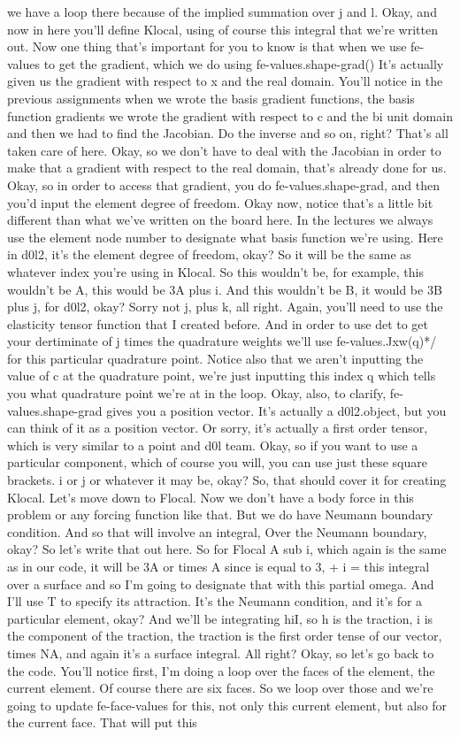 \documentclass[10pt]{article}
\begin{document}
we have a loop there because of the implied summation over j and l. Okay, and now in here you'll define Klocal, using of course this integral that we're written out. Now one thing that's important for you to know is that when we use fe-values to get the gradient, which we do using fe-values.shape-grad() It's actually given us the gradient with respect to x and the real domain. You'll notice in the previous assignments when we wrote the basis gradient functions, the basis function gradients we wrote the gradient with respect to c and the bi unit domain and then we had to find the Jacobian. Do the inverse and so on, right? That's all taken care of here. Okay, so we don't have to deal with the Jacobian in order to make that a gradient with respect to the real domain, that's already done for us. Okay, so in order to access that gradient, you do fe-values.shape-grad, and then you'd input the element degree of freedom. Okay now, notice that's a little bit different than what we've written on the board here. In the lectures we always use the element node number to designate what basis function we're using. Here in d0l2, it's the element degree of freedom, okay? So it will be the same as whatever index you're using in Klocal. So this wouldn't be, for example, this wouldn't be A, this would be 3A plus i. And this wouldn't be B, it would be 3B plus j, for d0l2, okay? Sorry not j, plus k, all right. Again, you'll need to use the elasticity tensor function that I created before. And in order to use det to get your dertiminate of j times the quadrature weights we'll use fe-values.Jxw(q)*/ for this particular quadrature point. Notice also that we aren't inputting the value of c at the quadrature point, we're just inputting this index q which tells you what quadrature point we're at in the loop. Okay, also, to clarify, fe-values.shape-grad gives you a position vector. It's actually a d0l2.object, but you can think of it as a position vector. Or sorry, it's actually a first order tensor, which is very similar to a point and d0l team. Okay, so if you want to use a particular component, which of course you will, you can use just these square brackets. i or j or whatever it may be, okay? So, that should cover it for creating Klocal. Let's move down to Flocal. Now we don't have a body force in this problem or any forcing function like that. But we do have Neumann boundary condition. And so that will involve an integral, Over the Neumann boundary, okay? So let's write that out here. So for Flocal A sub i, which again is the same as in our code, it will be 3A or times A since is equal to 3, + i = this integral over a surface and so I'm going to designate that with this partial omega. And I'll use T to specify its attraction. It's the Neumann condition, and it's for a particular element, okay? And we'll be integrating hiI, so h is the traction, i is the component of the traction, the traction is the first order tense of our vector, times NA, and again it's a surface integral. All right? Okay, so let's go back to the code. You'll notice first, I'm doing a loop over the faces of the element, the current element. Of course there are six faces. So we loop over those and we're going to update fe-face-values for this, not only this current element, but also for the current face. That will put this 
\end{document}
